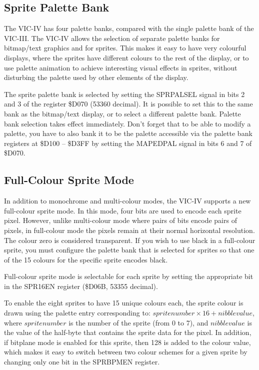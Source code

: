 \subsection{Sprite Palette Bank}

The VIC-IV has four palette banks, compared with the single palette bank of the VIC-III.
The VIC-IV allows the selection of separate palette banks for bitmap/text graphics and for sprites.  This makes it easy to have
very colourful displays, where the sprites have different colours to the rest of the display, or to use palette animation to achieve
interesting visual effects in sprites, without disturbing the palette used by other elements of the display.

The sprite palette bank is selected by setting the SPRPALSEL signal in bits 2 and 3 of the register \$D070 (53360 decimal).
It is possible to set this to the same bank as the bitmap/text display, or to select a different palette bank.
Palette bank selection takes effect immediately.  Don't forget that to be able to modify a palette, you have to also bank it
to be the palette accessible via the palette bank registers at \$D100 -- \$D3FF by setting the MAPEDPAL signal in bits 6 and 7 of
\$D070.

\subsection{Full-Colour Sprite Mode}

In addition to monochrome and multi-colour modes, the VIC-IV supports a new full-colour sprite mode.  In this mode, four bits are used to
encode each sprite pixel.  However, unlike multi-colour mode where pairs of bits encode pairs of pixels, in full-colour mode the pixels
remain at their normal horizontal resolution.  The colour zero is considered transparent. If you wish to use black in a full-colour sprite,
you must configure the palette bank that is selected for sprites so that one of the 15 colours for the specific sprite encodes black.

Full-colour sprite mode is selectable for each sprite by setting the appropriate bit in the SPR16EN register (\$D06B, 53355 decimal).

To enable the eight sprites to have 15 unique colours each, the sprite colour is drawn using the palette entry corresponding to:
$sprite number \times 16 + nibble value$, where $sprite number$ is the number of the sprite (from 0 to 7), and $nibble value$ is the value
of the half-byte that contains the sprite data for the pixel.  In addition, if bitplane mode is enabled for this sprite, then 128 is
added to the colour value, which makes it easy to switch between two colour schemes for a given sprite by changing only one bit in the
SPRBPMEN register.

